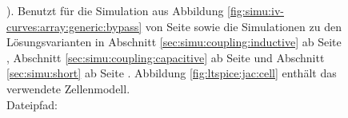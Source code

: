 \begin{figure}[h!tb]
{        ). Benutzt       f\"ur       die       Simulation       aus
        Abbildung   \ref{fig:simu:iv-curves:array:generic:bypass}  von   Seite
        \pageref{fig:simu:iv-curves:array:generic:bypass}       sowie      die
        Simulationen zu den L\"osungsvarianten in Abschnitt
        \ref{sec:simu:coupling:inductive} ab Seite
        \pageref{sec:simu:coupling:inductive}, Abschnitt
        \ref{sec:simu:coupling:capacitive} ab Seite
        \pageref{sec:simu:coupling:capacitive} und Abschnitt
        \ref{sec:simu:short} ab Seite
        \pageref{sec:simu:short}.
        Abbildung   \ref{fig:ltspice:jac:cell}    enth\"alt   das   verwendete
        Zellenmodell.\protect\\
        Dateipfad: %
    }
    \label{fig:ltspice:jacModule:Diode}
\end{figure}
